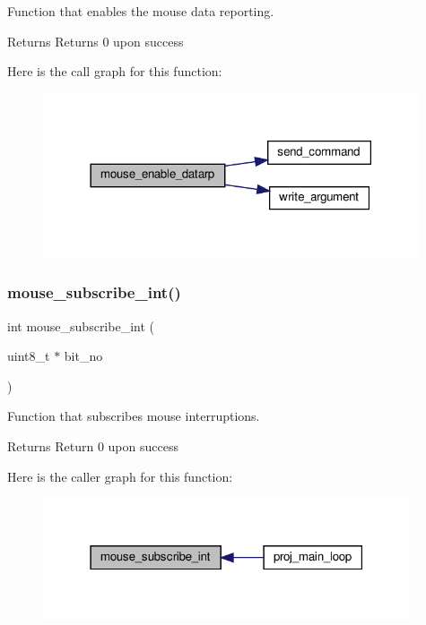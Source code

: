 Function that enables the mouse data reporting. 

\begin{DoxyReturn}{Returns}
Returns 0 upon success 
\end{DoxyReturn}
Here is the call graph for this function\+:
\nopagebreak
\begin{figure}[H]
\begin{center}
\leavevmode
\includegraphics[width=314pt]{group__mouse_ga90562ec8e969e4014d728adb0fc91e31_cgraph}
\end{center}
\end{figure}
\mbox{\label{group__mouse_ga9da18257ff113b686bb826d154bfaa87}} 
\subsubsection{\texorpdfstring{mouse\+\_\+subscribe\+\_\+int()}{mouse\_subscribe\_int()}}
{\footnotesize\ttfamily int mouse\+\_\+subscribe\+\_\+int (\begin{DoxyParamCaption}\item[{uint8\+\_\+t $\ast$}]{bit\+\_\+no }\end{DoxyParamCaption})}



Function that subscribes mouse interruptions. 

\begin{DoxyReturn}{Returns}
Return 0 upon success 
\end{DoxyReturn}
Here is the caller graph for this function\+:
\nopagebreak
\begin{figure}[H]
\begin{center}
\leavevmode
\includegraphics[width=307pt]{group__mouse_ga9da18257ff113b686bb826d154bfaa87_icgraph}
\end{center}
\end{figure}
\mbox{\label{group__mouse_ga685ad2706aca36d9869a30a19b9f446a}} 
